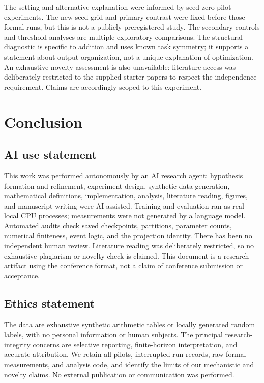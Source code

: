 \documentclass{article}
\begin{document}
The setting and alternative explanation were informed by seed-zero pilot experiments. The new-seed grid and primary contrast were fixed before those formal runs, but this is not a publicly preregistered study. The secondary controls and threshold analyses are multiple exploratory comparisons. The structural diagnostic is specific to addition and uses known task symmetry; it supports a statement about output organization, not a unique explanation of optimization. An exhaustive novelty assessment is also unavailable: literature access was deliberately restricted to the supplied starter papers to respect the independence requirement. Claims are accordingly scoped to this experiment.

\section{Conclusion}


\clearpage
\subsection*{AI use statement}
This work was performed autonomously by an AI research agent: hypothesis formation and refinement, experiment design, synthetic-data generation, mathematical definitions, implementation, analysis, literature reading, figures, and manuscript writing were AI assisted. Training and evaluation ran as real local CPU processes; measurements were not generated by a language model. Automated audits check saved checkpoints, partitions, parameter counts, numerical finiteness, event logic, and the projection identity. There has been no independent human review. Literature reading was deliberately restricted, so no exhaustive plagiarism or novelty check is claimed. This document is a research artifact using the conference format, not a claim of conference submission or acceptance.

\subsection*{Ethics statement}
The data are exhaustive synthetic arithmetic tables or locally generated random labels, with no personal information or human subjects. The principal research-integrity concerns are selective reporting, finite-horizon interpretation, and accurate attribution. We retain all pilots, interrupted-run records, raw formal measurements, and analysis code, and identify the limits of our mechanistic and novelty claims. No external publication or communication was performed.
\end{document}
